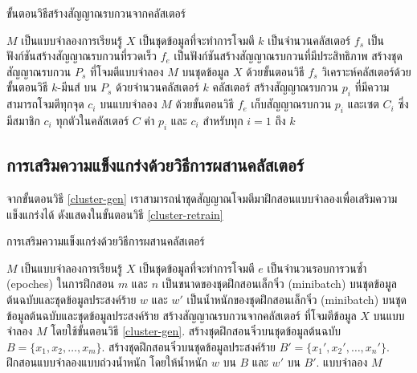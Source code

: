 \begin{algorithm} 
    \caption{ขั้นตอนวิธีสร้างสัญญาณรบกวนจากคลัสเตอร์}
    \label{cluster-gen}
    \begin{algorithmic}
        \REQUIRE $M$ เป็นแบบจำลองการเรียนรู้
        \REQUIRE $X$ เป็นชุดข้อมูลที่จะทำการโจมตี
        \REQUIRE $k$ เป็นจำนวนคลัสเตอร์
        \REQUIRE $f_s$ เป็นฟังก์ชันสร้างสัญญาณรบกวนที่รวดเร็ว
        \REQUIRE $f_e$ เป็นฟังก์ชันสร้างสัญญาณรบกวนที่มีประสิทธิภาพ
        \STATE สร้างชุดสัญญาณรบกวน $P_s$ ที่โจมตีแบบจำลอง $M$ บนชุดข้อมูล $X$ ด้วยขั้นตอนวิธี $f_s$
        \STATE วิเคราะห์คลัสเตอร์ด้วยขั้นตอนวิธี $k$-มีนส์ บน $P_s$ ด้วยจำนวนคลัสเตอร์ $k$ คลัสเตอร์
            \STATE สร้างสัญญาณรบกวน $p_i$ ที่มีความสามารถโจมตีทุกจุด $c_i$ บนแบบจำลอง $M$ ด้วยขั้นตอนวิธี $f_e$
            \STATE เก็บสัญญาณรบกวน $p_i$ และเซต $C_i$ ซึ่งมีสมาชิก $c_i$ ทุกตัวในคลัสเตอร์ $C$
        \ENDFOR
        \RETURN ค่า $p_i$ และ $c_i$ สำหรับทุก $i = 1$ ถึง $k$
    \end{algorithmic}
\end{algorithm}

\subsection{การเสริมความแข็งแกร่งด้วยวิธีการผสานคลัสเตอร์}

จากขั้นตอนวิธี \ref{cluster-gen} เราสามารถนำชุดสัญญาณโจมตีมาฝึกสอนแบบจำลองเพื่อเสริมความแข็งแกร่งได้ ดังแสดงในขั้นตอนวิธี \ref{cluster-retrain}

\begin{algorithm} 
    \caption{การเสริมความแข็งแกร่งด้วยวิธีการผสานคลัสเตอร์}
    \label{cluster-retrain}
    \begin{algorithmic}
        \REQUIRE $M$ เป็นแบบจำลองการเรียนรู้
        \REQUIRE $X$ เป็นชุดข้อมูลที่จะทำการโจมตี
        \REQUIRE $e$ เป็นจำนวนรอบการวนซ้ำ (epoches) ในการฝึกสอน
        \REQUIRE $m$ และ $n$ เป็นขนาดของชุดฝึกสอนเล็กจิ๋ว (minibatch) บนชุดข้อมูลต้นฉบับและชุดข้อมูลประสงค์ร้าย
        \REQUIRE $w$ และ $w'$ เป็นน้ำหนักของชุดฝึกสอนเล็กจิ๋ว (minibatch) บนชุดข้อมูลต้นฉบับและชุดข้อมูลประสงค์ร้าย
        \STATE สร้างสัญญาณรบกวนจากคลัสเตอร์ ที่โจมตีข้อมูล $X$ บนแบบจำลอง $M$ โดยใช้ขั้นตอนวิธี \ref{cluster-gen}.
            \STATE สร้างชุดฝึกสอนจิ๋วบนชุดข้อมูลต้นฉบับ $B=\{x_1, x_2, \dots, x_m\}$.
            \STATE สร้างชุดฝึกสอนจิ๋วบนชุดข้อมูลประสงค์ร้าย $B'=\{x_1', x_2', \dots, x_n'\}$.
            \STATE ฝึกสอนแบบจำลองแบบถ่วงน้ำหนัก โดยให้น้ำหนัก $w$ บน $B$ และ $w'$ บน $B'$.
        \ENDFOR
        \RETURN แบบจำลอง $M$
    \end{algorithmic}
\end{algorithm}

